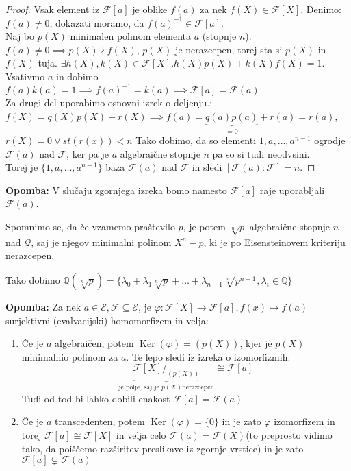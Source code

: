 \documentclass[a4paper]{article}
\newcounter{environment:definition_counter}
\newcounter{environment:theorem_counter}
\newcounter{environment:statement_counter}
\newenvironment{remark}
{\textbf{Opomba:}}
{}
\renewcommand{\ker}{\ensuremath{\operatorname{Ker}}} %
\begin{document}
\begin{proof}
Vsak element iz $\mathcal{F}[a]$ je oblike $f(a)$ za nek $f(X) \in \mathcal{F}[X]$. Denimo: $f(a) \neq 0$, dokazati moramo, da $f(a)^{-1} \in \mathcal{F}[a]$.\\
Naj bo $p(X)$ minimalen polinom elementa $a$ (stopnje $n$). $f(a) \neq 0 \implies p(X) \nmid f(X)$, $p(X)$ je nerazcepen, torej sta si $p(X)$ in $f(X)$ tuja. $\exists h(X), k(X) \in \mathcal{F}[X]. h(X) p(X) + k(X)f(X) = 1$. Vsativmo $a$ in dobimo $f(a)k(a) = 1 \implies f(a)^{-1} = k(a) \implies \mathcal{F}[a] = \mathcal{F}(a)$\\
Za drugi del uporabimo osnovni izrek o deljenju.:
$f(X) = q(X)p(X) + r(X) \implies f(a) = \underbrace{q(a)p(a)}_{=0} + r(a) = r(a)$, $r(X) = 0 \lor st(r(x)) < n$
Tako dobimo, da so elementi $1, a, \dots , a^{n-1}$ ogrodje $\mathcal{F}(a)$ nad $\mathcal{F}$, ker pa je $a$ algebraične stopnje $n$ pa so si tudi neodvsini.\\
Torej je $\{1, a, \dots, a^{n-1} \}$ baza $\mathcal{F}(a)$ nad $\mathcal{F}$ in sledi $[\mathcal{F}(a):\mathcal{F}] = n$.
\end{proof}

\begin{remark}
V slučaju zgornjega izreka bomo namesto $\mathcal{F}[a]$ raje uporabljali $\mathcal{F}(a)$.
\end{remark}

Spomnimo se, da če vzamemo praštevilo $p$, je potem $\sqrt[n]{p}$ algebraične stopnje $n$ nad $\mathcal{Q}$, saj je njegov minimalni polinom $X^n - p$, ki je po Eisensteinovem kriteriju nerazcepen.

Tako dobimo $\mathbb{Q}(\sqrt[n]{p}) = \{ \lambda_0 + \lambda_1 \sqrt[n]{p} + \dots  + \lambda_{n-1}\sqrt[n]{p^{n-1}}, \lambda_i \in \mathbb{Q} \}$


\begin{remark}
Za nek $a \in \mathcal{E}, \mathcal{F} \subseteq \mathcal{E}$, je $\varphi : \mathcal{F}[X] \to \mathcal{F}[a], f(x) \mapsto f(a)$ surjektivni (evalvacijski) homomorfizem in velja:
\begin{enumerate}
\item Če je $a$ algebraičen, potem $\ker(\varphi) = (p(X))$, kjer je $p(X)$ minimalnio polinom za $a$. Te lepo sledi iz izreka o izomorfizmih: 
$$\underbrace{\mathcal{F}[X]/_{(p(X))}}_{\text{je polje, saj je } p(X) \text{nerazcepen}} \cong \mathcal{F}[a]$$
Tudi od tod bi lahko dobili enakost $\mathcal{F}[a] = \mathcal{F}(a)$
\item Če je $a$ transcedenten, potem $\ker(\varphi) = \{0\}$ in je zato $\varphi$ izomorfizem in torej $\mathcal{F}[a] \cong \mathcal{F}[X]$ in velja celo $\mathcal{F}(a) = \mathcal{F}(X)$(to preprosto vidimo tako, da poiščemo razširitev preslikave iz zgornje vrstice) in je zato $\mathcal{F}[a] \subsetneq \mathcal{F}(a)$
\end{enumerate}
\end{remark}
\end{document}
